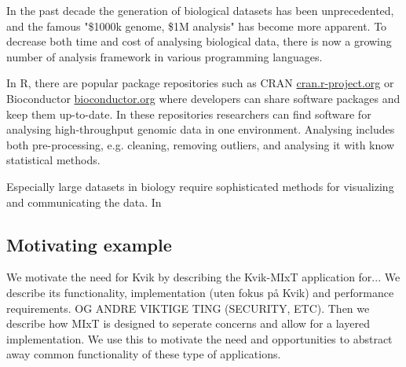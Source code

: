 

In the past decade the generation of biological datasets has been unprecedented, and the famous "\$1000k genome, \$1M analysis"\cite{} has become more apparent. To decrease both time and cost of analysing biological data, there is now a growing number of analysis framework in various programming languages. \cite{}

In R, there are popular package repositories such as CRAN \url{cran.r-project.org} or Bioconductor \url{bioconductor.org} where developers can share software packages and keep them up-to-date. In these repositories researchers can find software for analysing high-throughput genomic data in one environment. Analysing includes both pre-processing, e.g. cleaning, removing outliers, and analysing it with know statistical methods.

Especially large datasets in biology require sophisticated methods for visualizing and communicating the data. In



\subsection{Motivating example}


We motivate the need for Kvik by describing the Kvik-MIxT application for... We describe its functionality, implementation (uten fokus på Kvik) and performance requirements. OG ANDRE VIKTIGE TING (SECURITY, ETC). Then we describe how MIxT is designed to seperate concerns and allow for a layered implementation. We use this to motivate the need and opportunities to abstract away common functionality of these type of applications. 

